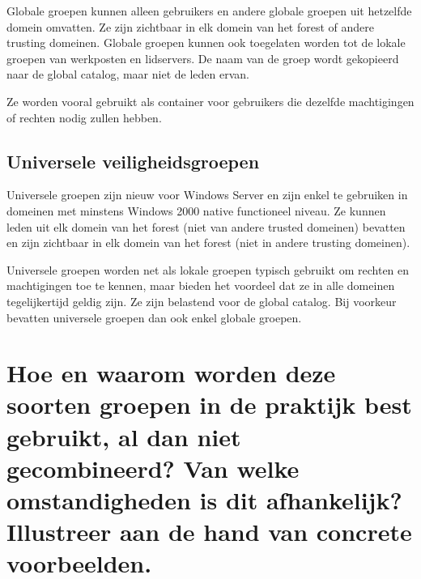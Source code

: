 Globale groepen kunnen alleen gebruikers en andere globale groepen uit hetzelfde
domein omvatten. Ze zijn zichtbaar in elk domein van het forest of andere
trusting domeinen. Globale groepen kunnen ook toegelaten worden tot de lokale
groepen van werkposten en lidservers. De naam van de groep wordt gekopieerd naar
de global catalog, maar niet de leden ervan.

Ze worden vooral gebruikt als container voor gebruikers die dezelfde
machtigingen of rechten nodig zullen hebben.

\subsection{Universele veiligheidsgroepen}

Universele groepen zijn nieuw voor Windows Server en zijn enkel te gebruiken in
domeinen met minstens Windows 2000 native functioneel niveau. Ze kunnen leden
uit elk domein van het forest (niet van andere trusted domeinen) bevatten en
zijn zichtbaar in elk domein van het forest (niet in andere trusting domeinen).

Universele groepen worden net als lokale groepen typisch gebruikt om rechten en
machtigingen toe te kennen, maar bieden het voordeel dat ze in alle domeinen
tegelijkertijd geldig zijn. Ze zijn belastend voor de global catalog. Bij
voorkeur bevatten universele groepen dan ook enkel globale groepen.

\section{Hoe en waarom worden deze soorten groepen in de praktijk best gebruikt,
al dan niet gecombineerd? Van welke omstandigheden is dit afhankelijk?
Illustreer aan de hand van concrete voorbeelden.}

